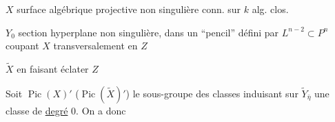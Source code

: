 $X$ surface  algébrique projective non singulière conn.
sur $k$ alg. clos.

$Y_0$ section hyperplane non singulière, dans un
``pencil'' défini par $L^{n-2}\subset P^n$ coupant $X$
transversalement en $Z$

$\widetilde X$  en faisant éclater $Z$



Soit $\operatorname{Pic}(X)'$ ($\operatorname{Pic}(\widetilde X)'$) le sous-groupe des
 classes induisant sur $\widetilde Y_{\bar\eta}$ une classe
de \uline{degré} $0$. On a donc

